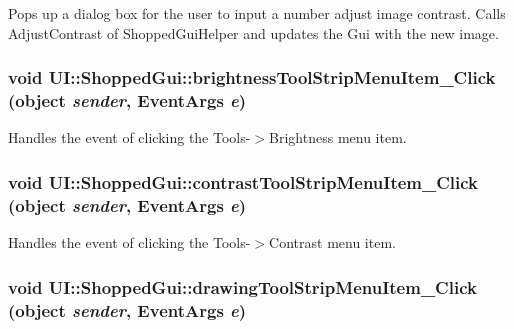 \label{class_u_i_1_1_shopped_gui_a61ec62f5b9069ad0694aac24efacb901}
Pops up a dialog box for the user to input a number adjust image contrast. Calls AdjustContrast of ShoppedGuiHelper and updates the Gui with the new image. \hypertarget{class_u_i_1_1_shopped_gui_af34ff2a7d4362d8b1ad623584997ef64}{
\subsubsection[{brightnessToolStripMenuItem\_\-Click}]{\setlength{\rightskip}{0pt plus 5cm}void UI::ShoppedGui::brightnessToolStripMenuItem\_\-Click (object {\em sender}, \/  EventArgs {\em e})}}
\label{class_u_i_1_1_shopped_gui_af34ff2a7d4362d8b1ad623584997ef64}
Handles the event of clicking the Tools-\/$>$Brightness menu item. \hypertarget{class_u_i_1_1_shopped_gui_abbc4b01527f315dce800b0db4a1b4677}{
\subsubsection[{contrastToolStripMenuItem\_\-Click}]{\setlength{\rightskip}{0pt plus 5cm}void UI::ShoppedGui::contrastToolStripMenuItem\_\-Click (object {\em sender}, \/  EventArgs {\em e})}}
\label{class_u_i_1_1_shopped_gui_abbc4b01527f315dce800b0db4a1b4677}
Handles the event of clicking the Tools-\/$>$Contrast menu item. \hypertarget{class_u_i_1_1_shopped_gui_aca1101f73de09ed9dade7398c1415bd0}{
\subsubsection[{drawingToolStripMenuItem\_\-Click}]{\setlength{\rightskip}{0pt plus 5cm}void UI::ShoppedGui::drawingToolStripMenuItem\_\-Click (object {\em sender}, \/  EventArgs {\em e})}}
